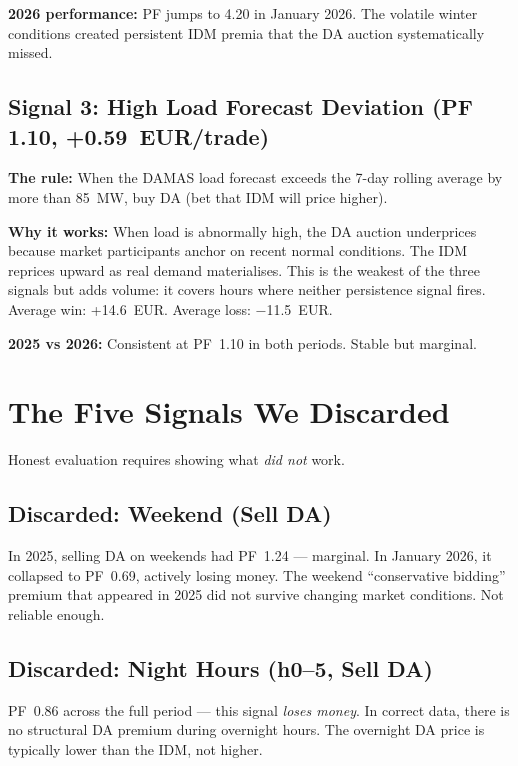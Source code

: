 \documentclass[11pt,a4paper]{article}
\begin{document}
\textbf{2026 performance:} PF jumps to 4.20 in January 2026. The volatile winter conditions created persistent IDM premia that the DA auction systematically missed.

\subsection{Signal 3: High Load Forecast Deviation (PF 1.10, +0.59~EUR/trade)}

\textbf{The rule:} When the DAMAS load forecast exceeds the 7-day rolling average by more than 85~MW, buy DA (bet that IDM will price higher).

\textbf{Why it works:} When load is abnormally high, the DA auction underprices because market participants anchor on recent normal conditions. The IDM reprices upward as real demand materialises. This is the weakest of the three signals but adds volume: it covers hours where neither persistence signal fires. Average win: +14.6~EUR. Average loss: $-$11.5~EUR.

\textbf{2025 vs 2026:} Consistent at PF~1.10 in both periods. Stable but marginal.

\section{The Five Signals We Discarded}

Honest evaluation requires showing what \emph{did not} work.

\subsection{Discarded: Weekend (Sell DA)}

In 2025, selling DA on weekends had PF~1.24 --- marginal. In January 2026, it collapsed to PF~0.69, actively losing money. The weekend ``conservative bidding'' premium that appeared in 2025 did not survive changing market conditions. Not reliable enough.

\subsection{Discarded: Night Hours (h0--5, Sell DA)}

PF~0.86 across the full period --- this signal \emph{loses money}. In correct data, there is no structural DA premium during overnight hours. The overnight DA price is typically lower than the IDM, not higher.
\end{document}
